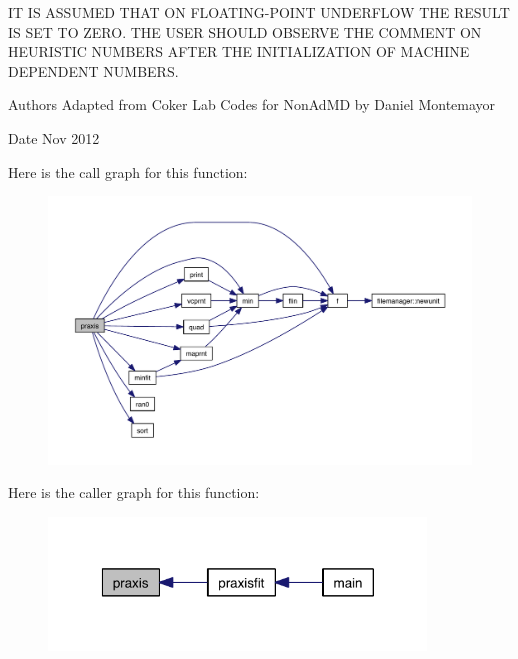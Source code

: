 I\-T I\-S A\-S\-S\-U\-M\-E\-D T\-H\-A\-T O\-N F\-L\-O\-A\-T\-I\-N\-G-\/\-P\-O\-I\-N\-T U\-N\-D\-E\-R\-F\-L\-O\-W T\-H\-E R\-E\-S\-U\-L\-T I\-S S\-E\-T T\-O Z\-E\-R\-O. T\-H\-E U\-S\-E\-R S\-H\-O\-U\-L\-D O\-B\-S\-E\-R\-V\-E T\-H\-E C\-O\-M\-M\-E\-N\-T O\-N H\-E\-U\-R\-I\-S\-T\-I\-C N\-U\-M\-B\-E\-R\-S A\-F\-T\-E\-R T\-H\-E I\-N\-I\-T\-I\-A\-L\-I\-Z\-A\-T\-I\-O\-N O\-F M\-A\-C\-H\-I\-N\-E D\-E\-P\-E\-N\-D\-E\-N\-T N\-U\-M\-B\-E\-R\-S. \begin{DoxyAuthor}{Authors}
Adapted from Coker Lab Codes for Non\-Ad\-M\-D by Daniel Montemayor 
\end{DoxyAuthor}
\begin{DoxyDate}{Date}
Nov 2012 
\end{DoxyDate}


Here is the call graph for this function\-:
\nopagebreak
\begin{figure}[H]
\begin{center}
\leavevmode
\includegraphics[width=350pt]{praxis_8f_af91941b7f0c3ddb787c772ca565e1855_cgraph}
\end{center}
\end{figure}




Here is the caller graph for this function\-:
\nopagebreak
\begin{figure}[H]
\begin{center}
\leavevmode
\includegraphics[width=284pt]{praxis_8f_af91941b7f0c3ddb787c772ca565e1855_icgraph}
\end{center}
\end{figure}


